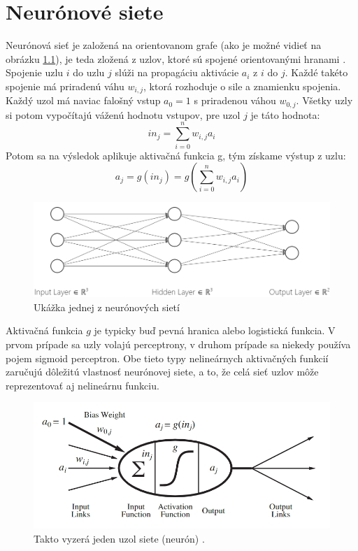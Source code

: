 \chapter{Neurónové siete}


Neurónová sieť je založená na orientovanom grafe (ako je možné vidieť na obrázku \ref{fig:nn}), je teda zložená z uzlov, ktoré sú spojené orientovanými hranami \citep{rnn:spol}.
Spojenie uzlu $i$ do uzlu $j$ slúži na propagáciu aktivácie $a_i$ z $i$ do $j$.
Každé takéto spojenie má priradenú váhu $w_{i,j}$, ktorá rozhoduje o sile a znamienku spojenia.
Každý uzol má naviac falošný vstup $a_0=1$ s priradenou váhou $w_{0,j}$.
Všetky uzly si potom vypočítajú váženú hodnotu vstupov, pre uzol $j$ je táto hodnota:
$$in_j=\sum^n_{i=0}w_{i,j}a_i$$
Potom sa na výsledok aplikuje aktivačná funkcia g, tým získame výstup z uzlu:
$$a_j=g(in_j)=g\left(\sum^n_{i=0}w_{i,j}a_i\right)$$

\begin{figure} \label{fig:nn}
\includegraphics[width=\textwidth]{../img/nn.png}
\caption{Ukážka jednej z neurónových sietí}
\end{figure}

Aktivačná funkcia $g$ je typicky buď pevná hranica alebo logistická funkcia.
V prvom prípade sa uzly volajú perceptrony, v druhom prípade sa niekedy používa pojem sigmoid perceptron.
Obe tieto typy nelineárnych aktivačných funkcií zaručujú dôležitú vlastnosť neurónovej siete, a to, že celá sieť uzlov môže reprezentovať aj nelineárnu funkciu.

\begin{figure}
\includegraphics[width=\textwidth]{../img/nn_aima_neuron.png}
\caption{Takto vyzerá jeden uzol siete (neurón) \citep{aima}.}
\end{figure}

